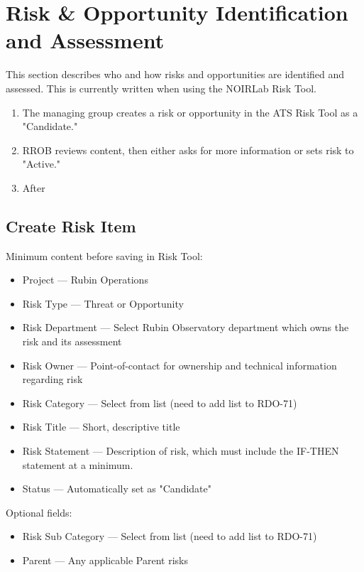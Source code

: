 \section{Risk \& Opportunity Identification and Assessment}
\label{sec:id-assess}

This section describes who and how risks and opportunities are identified and assessed.
This is currently written when using the NOIRLab Risk Tool.

\begin{enumerate}
	\item The managing group creates a risk or opportunity in the ATS Risk Tool as a "Candidate."
	\item RROB reviews content, then either asks for more information or sets risk to "Active."
	\item After 
\end{enumerate}

\subsection{Create Risk Item}

Minimum content before saving in Risk Tool:
\begin{itemize}
	\item Project --- Rubin Operations
	\item Risk Type --- Threat or Opportunity
	\item Risk Department --- Select Rubin Observatory department which owns the risk and its assessment
	\item Risk Owner --- Point-of-contact for ownership and technical information regarding risk
	\item Risk Category --- Select from list (need to add list to RDO-71)
	\item Risk Title --- Short, descriptive title
	\item Risk Statement --- Description of risk, which must include the IF-THEN statement at a minimum.
	\item Status --- Automatically set as "Candidate"
\end{itemize}

Optional fields:
\begin{itemize}
	\item Risk Sub Category --- Select from list (need to add list to RDO-71)
	\item Parent --- Any applicable Parent risks
\end{itemize}

